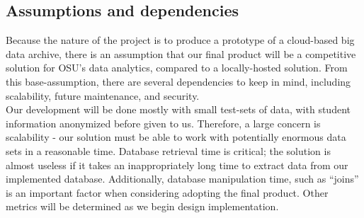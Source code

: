 	\subsection{Assumptions and dependencies}
        Because the nature of the project is to produce a prototype of a cloud-based big data archive, there is an assumption that our final product will be a competitive solution for OSU’s data analytics, compared to a locally-hosted solution. From this base-assumption, there are several dependencies to keep in mind, including scalability, future maintenance, and security.\\ 
        
        \noindent Our development will be done mostly with small test-sets of data, with student information anonymized before given to us. Therefore, a large concern is scalability - our solution must be able to work with potentially enormous data sets in a reasonable time. Database retrieval time is critical; the solution is almost useless if it takes an inappropriately long time to extract data from our implemented database. Additionally, database manipulation time, such as “joins” is an important factor when considering adopting the final product. Other metrics will be determined as we begin design implementation.
    